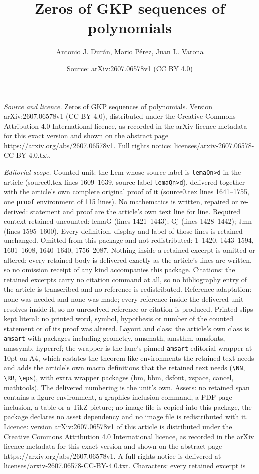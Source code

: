 \documentclass[10pt,a4paper]{amsart}
\title[Zeros of GKP sequences of polynomials]{Zeros of GKP sequences of polynomials}
\author{Antonio J. Dur\'an, Mario P\'erez, Juan L. Varona}
\date{Source: arXiv:2607.06578v1 (CC BY 4.0)}
\begin{document}
\maketitle

\noindent\emph{Source and licence.} Zeros of GKP sequences of polynomials. Version arXiv:2607.06578v1 (CC BY 4.0), distributed under the Creative Commons Attribution 4.0 International licence, as recorded in the arXiv licence metadata for this exact version and shown on the abstract page https://arxiv.org/abs/2607.06578v1. Full rights notice: licenses/arxiv-2607.06578-CC-BY-4.0.txt.\par\smallskip

\noindent\textit{Editorial scope.} Counted unit: the Lem whose source label is \texttt{lemaQn>d} in the article (source0.tex lines 1609--1639, source label \texttt{lemaQn>d}), delivered together with the article's own complete original proof of it (source0.tex lines 1641--1755, one \texttt{proof} environment of 115 lines). No mathematics is written, repaired or re-derived: statement and proof are the article's own text line for line. Required context retained uncounted: lemaG (lines 1421--1443); Gj (lines 1428--1442); Jmn (lines 1595--1600). Every definition, display and label of those lines is retained unchanged. Omitted from this package and not redistributed: 1--1420, 1443--1594, 1601--1608, 1640--1640, 1756--2087. Nothing inside a retained excerpt is omitted or altered: every retained body is delivered exactly as the article's lines are written, so no omission receipt of any kind accompanies this package. Citations: the retained excerpts carry no citation command at all, so no bibliography entry of the article is transcribed and no reference is redistributed. Reference adaptation: none was needed and none was made; every reference inside the delivered unit resolves inside it, so no unresolved reference or citation is produced. Printed slips kept literal: no printed word, symbol, hypothesis or number of the counted statement or of its proof was altered. Layout and class: the article's own class is \texttt{amsart} with packages including geometry, amsmath, amsthm, amsfonts, amssymb, hyperref; the wrapper is the lane's pinned \texttt{amsart} editorial wrapper at 10pt on A4, which restates the theorem-like environments the retained text needs and adds the article's own macro definitions that the retained text needs (\texttt{\textbackslash NN}, \texttt{\textbackslash RR}, \texttt{\textbackslash eps}), with extra wrapper packages (bm, bbm, dsfont, xspace, cancel, mathtools). The delivered numbering is the unit's own. Assets: no retained span contains a figure environment, a graphics-inclusion command, a PDF-page inclusion, a table or a TikZ picture; no image file is copied into this package, the package declares no asset dependency and no image file is redistributed with it. Licence: version arXiv:2607.06578v1 of this article is distributed under the Creative Commons Attribution 4.0 International licence, as recorded in the arXiv licence metadata for this exact version and shown on the abstract page https://arxiv.org/abs/2607.06578v1. A full rights notice is delivered at licenses/arxiv-2607.06578-CC-BY-4.0.txt. Characters: every retained excerpt is 
\end{document}

